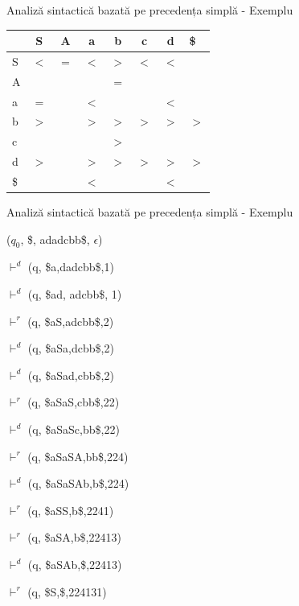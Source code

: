 \documentclass[pdf]{beamer}
\begin{document}
\begin{frame}{Analiză sintactică bazată pe precedența simplă - Exemplu}

\centering
\begin{tabular}{| l | c | c | c | c | c | c | l|}
    \hline
       & S & A & a & b & c & d & \$ \\
     \hline
     S & $<$ & $=$ & $<$ & $>$ & $<$ & $<$ &  \\
     \hline
     A &  &  &  & $=$ &  &  &  \\
     \hline
     a & $=$ &  & $<$ &  &  & $<$ &  \\
     \hline
     b & $>$ &  & $>$ & $>$ & $>$ & $>$ & $>$ \\
     \hline
     c &  &  &  & $>$ &  & &  \\
     \hline
     d & $>$ &  & $>$ & $>$ & $>$ & $>$ & $>$ \\
     \hline
     \$ &  &  & $<$ &  &  & $<$ &  \\
    \hline
\end{tabular}

\end{frame}



\begin{frame}{Analiză sintactică bazată pe precedența simplă - Exemplu}

($q_0$, \$, adadcbb\$, $\epsilon$) 

$\vdash^{d}$ (q, \$a,dadcbb\$,1)  

$\vdash^{d}$ (q, \$ad, adcbb\$, 1)

$\vdash^{r}$ (q, \$aS,adcbb\$,2) 

$\vdash^{d}$ (q, \$aSa,dcbb\$,2)

$\vdash^{d}$ (q, \$aSad,cbb\$,2)

$\vdash^{r}$ (q, \$aSaS,cbb\$,22)

$\vdash^{d}$ (q, \$aSaSc,bb\$,22)

$\vdash^{r}$ (q, \$aSaSA,bb\$,224)

$\vdash^{d}$ (q, \$aSaSAb,b\$,224)

$\vdash^{r}$ (q, \$aSS,b\$,2241)

$\vdash^{r}$ (q, \$aSA,b\$,22413)

$\vdash^{d}$ (q, \$aSAb,\$,22413)

$\vdash^{r}$ (q, \$S,\$,224131)

\end{frame}
\end{document}

